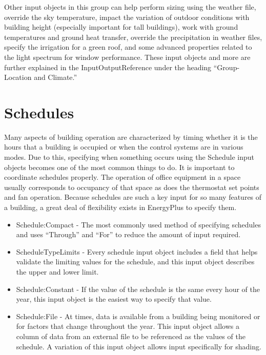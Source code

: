 Other input objects in this group can help perform sizing using the
weather file, override the sky temperature, impact the variation of
outdoor conditions with building height (especially important for
tall buildings), work with ground temperatures and ground heat transfer,
override the precipitation in weather files, specify the irrigation
for a green roof, and some advanced properties related to the light
spectrum for window performance. These input objects and more are
further explained in the InputOutputReference under the heading ``Group-Location
and Climate.''

\section{Schedules}

Many aspects of building operation are characterized by timing whether
it is the hours that a building is occupied or when the control systems
are in various modes. Due to this, specifying when something occurs
using the Schedule input objects becomes one of the most common things
to do. It is important to coordinate schedules properly. The operation
of office equipment in a space usually corresponds to occupancy of
that space as does the thermostat set points and fan operation. Because
schedules are such a key input for so many features of a building,
a great deal of flexibility exists in EnergyPlus to specify them.
\begin{itemize}
\item Schedule:Compact - The most commonly used method of specifying schedules
and uses ``Through'' and ``For'' to reduce the amount of input
required.
\item ScheduleTypeLimits - Every schedule input object includes a field
that helps validate the limiting values for the schedule, and this
input object describes the upper and lower limit.
\item Schedule:Constant - If the value of the schedule is the same every
hour of the year, this input object is the easiest way to specify
that value.
\item Schedule:File - At times, data is available from a building being
monitored or for factors that change throughout the year. This input
object allows a column of data from an external file to be referenced
as the values of the schedule. A variation of this input object allows
input specifically for shading.
\end{itemize}

